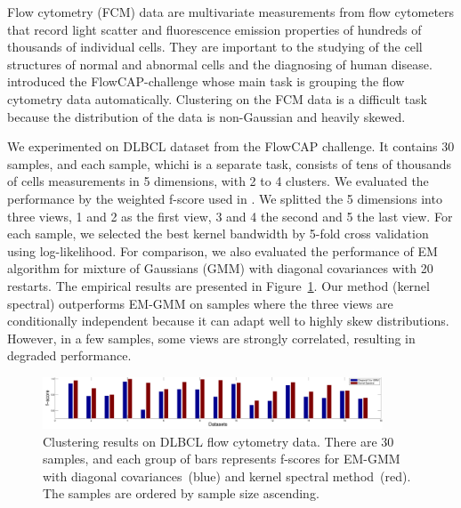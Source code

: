 
Flow cytometry (FCM) data are multivariate measurements from flow cytometers that record light scatter and fluorescence emission properties of hundreds of thousands of individual cells. They are important to the studying of the cell structures of normal and abnormal cells and the diagnosing of human disease. \citet{cytometry_nature} introduced the FlowCAP-challenge whose main task is grouping the flow cytometry data automatically. Clustering on the FCM data is a difficult task because the distribution of the data is non-Gaussian and heavily skewed. 

We experimented on DLBCL dataset from the FlowCAP challenge. It contains 30 samples, and each sample, whichi is a separate task, consists of tens of thousands of cells measurements in 5 dimensions, with 2 to 4 clusters. We evaluated the performance by the weighted f-score used in \cite{cytometry_nature}. We splitted the 5 dimensions into three views, 1 and 2 as the first view, 3 and 4 the second and 5 the last view. For each sample, we selected the best kernel bandwidth by 5-fold cross validation using log-likelihood. For comparison, we also evaluated the performance of EM algorithm for mixture of Gaussians (GMM) with diagonal covariances with 20 restarts. The empirical results are presented in Figure~\ref{fig:real_data}. Our method (kernel spectral) outperforms EM-GMM on samples where the three views are conditionally independent because it can adapt well to highly skew distributions. However, in a few samples, some views are strongly correlated, resulting in degraded performance. 


\begin{figure}
  \centering
  \includegraphics[width=0.9\textwidth]{../experiment/figure/paired_bar_chat_better} 
   \vspace{-3mm}
  \caption{Clustering results on DLBCL flow cytometry data. There are 30 samples, and each group of bars represents f-scores for EM-GMM with diagonal covariances~(blue) and kernel spectral method~(red). The samples are ordered by sample size ascending.}\label{fig:real_data}
  \vspace{-3mm}
\end{figure}
